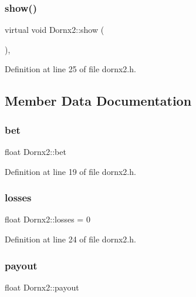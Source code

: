 \mbox{\label{class_dornx2_a358fdbc837f4bc24f66980a7153babe3}} 
\subsubsection{\texorpdfstring{show()}{show()}}
{\footnotesize\ttfamily virtual void Dornx2\+::show (\begin{DoxyParamCaption}{ }\end{DoxyParamCaption})\hspace{0.3cm}{\ttfamily [inline]}, {\ttfamily [virtual]}}



Definition at line 25 of file dornx2.\+h.



\subsection{Member Data Documentation}
\mbox{\label{class_dornx2_a625cb1bab8577b56ad9fdd30429b2cc1}} 
\subsubsection{\texorpdfstring{bet}{bet}}
{\footnotesize\ttfamily float Dornx2\+::bet}



Definition at line 19 of file dornx2.\+h.

\mbox{\label{class_dornx2_a901e60654dd16c22ab2f5bbf69e7ee47}} 
\subsubsection{\texorpdfstring{losses}{losses}}
{\footnotesize\ttfamily float Dornx2\+::losses = 0}



Definition at line 24 of file dornx2.\+h.

\mbox{\label{class_dornx2_a39b0aa95ebb2d298ce227e3052e9ee1f}} 
\subsubsection{\texorpdfstring{payout}{payout}}
{\footnotesize\ttfamily float Dornx2\+::payout}



